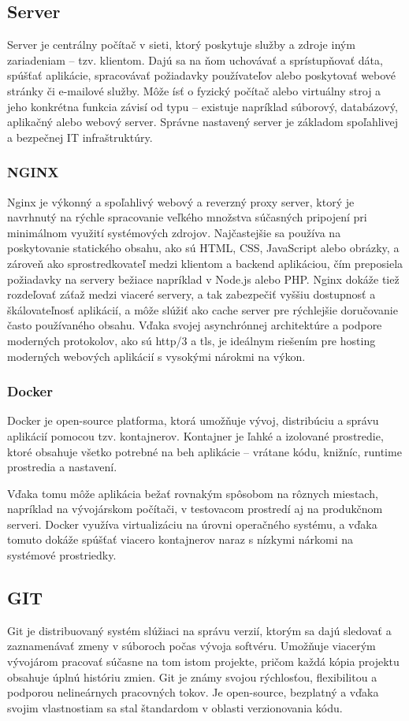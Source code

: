 \subsection{Server}
Server je centrálny počítač v sieti, ktorý poskytuje služby a zdroje iným zariadeniam – tzv. klientom. 
Dajú sa na ňom uchovávať a sprístupňovať dáta, spúšťať aplikácie, spracovávať požiadavky používateľov alebo poskytovať webové stránky či e-mailové služby.
 Môže ísť o fyzický počítač alebo virtuálny stroj a jeho konkrétna funkcia závisí od typu – existuje napríklad súborový, databázový, aplikačný alebo webový server. 
 Správne nastavený server je základom spoľahlivej a bezpečnej IT infraštruktúry.\cite{server}
\subsubsection*{NGINX}
Nginx je výkonný a spoľahlivý webový a reverzný proxy server, ktorý je navrhnutý na rýchle spracovanie veľkého množstva súčasných pripojení pri minimálnom využití systémových zdrojov. 
Najčastejšie sa používa na poskytovanie statického obsahu, ako sú HTML, CSS, JavaScript alebo obrázky, a zároveň ako sprostredkovateľ medzi klientom a backend aplikáciou, čím preposiela požiadavky na servery bežiace napríklad v Node.js alebo PHP. 
Nginx dokáže tiež rozdeľovať záťaž medzi viaceré servery, a tak zabezpečiť vyššiu dostupnosť a škálovateľnosť aplikácií, a môže slúžiť ako cache server pre rýchlejšie doručovanie často používaného obsahu.
 Vďaka svojej asynchrónnej architektúre a podpore moderných protokolov, ako sú \acrshort{http}/3 a \acrshort{tls}, je ideálnym riešením pre hosting moderných webových aplikácií s vysokými nárokmi na výkon.\cite{nginx}
\subsubsection*{Docker}
Docker je open-source platforma, ktorá umožňuje vývoj, distribúciu a správu aplikácií pomocou tzv. kontajnerov. 
Kontajner je ľahké a izolované prostredie, ktoré obsahuje všetko potrebné na beh aplikácie – vrátane kódu, knižníc, runtime prostredia a nastavení.

Vďaka tomu môže aplikácia bežať rovnakým spôsobom na rôznych miestach, napríklad na vývojárskom počítači, v testovacom prostredí aj na produkčnom serveri. 
Docker využíva virtualizáciu na úrovni operačného systému, a vďaka tomuto dokáže spúšťať viacero kontajnerov naraz s nízkymi nárkomi na systémové prostriedky.\cite{docker}
\subsection{GIT}
Git je distribuovaný systém slúžiaci na správu verzií, ktorým sa dajú sledovať a zaznamenávať zmeny v súboroch počas vývoja softvéru.
 Umožňuje viacerým vývojárom pracovať súčasne na tom istom projekte, pričom každá kópia projektu obsahuje úplnú históriu zmien. 
 Git je známy svojou rýchlosťou, flexibilitou a podporou nelineárnych pracovných tokov. 
Je open-source, bezplatný a vďaka svojim vlastnostiam sa stal štandardom v oblasti verzionovania kódu.\cite{git}

